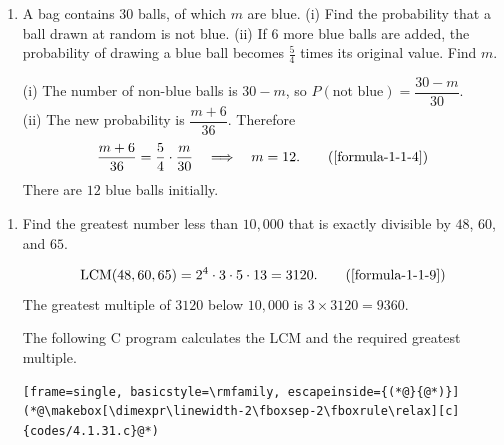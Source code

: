\newpage
\begin{enumerate}[label={},font=\normalfont,leftmargin=1.15cm,labelwidth=1.0cm,labelsep=0.15cm,itemindent=0pt,listparindent=0pt,parsep=0pt,topsep=0pt]
\item[4.1.30] A bag contains 30 balls, of which $m$ are blue. (i) Find the probability that a ball drawn at random is not blue. (ii) If 6 more blue balls are added, the probability of drawing a blue ball becomes $\frac54$ times its original value. Find $m$.

\vspace{0.7em}\par\solution


(i) The number of non-blue balls is $30-m$, so $P(\text{not blue})=\dfrac{30-m}{30}$.\\
(ii) The new probability is $\dfrac{m+6}{36}$. Therefore
\begin{equation*}
\frac{m+6}{36}=\frac54\cdot\frac{m}{30}
\quad\Longrightarrow\quad m=12.
\tag*{(\ref{formula-1-1-4})}\end{equation*}
There are $12$ blue balls initially.
\end{enumerate}

\vspace{1.2em}
\begin{enumerate}[label={},font=\normalfont,leftmargin=1.15cm,labelwidth=1.0cm,labelsep=0.15cm,itemindent=0pt,listparindent=0pt,parsep=0pt,topsep=0pt]
\item[4.1.31] Find the greatest number less than $10{,}000$ that is exactly divisible by $48$, $60$, and $65$.

\vspace{0.7em}\par\solution


\begin{equation*}
\operatorname{LCM}(48,60,65)=2^4\cdot3\cdot5\cdot13=3120.
\tag*{(\ref{formula-1-1-9})}\end{equation*}
The greatest multiple of $3120$ below $10{,}000$ is $3\times3120=\boxed{9360}$.

The following C program calculates the LCM and the required greatest multiple.
\begin{lstlisting}[frame=single, basicstyle=\rmfamily, escapeinside={(*@}{@*)}]
(*@\makebox[\dimexpr\linewidth-2\fboxsep-2\fboxrule\relax][c]{codes/4.1.31.c}@*)
\end{lstlisting}
\end{enumerate}

